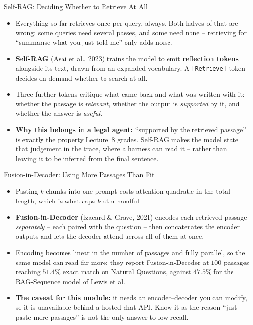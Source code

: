\begin{frame}{Self-RAG: Deciding Whether to Retrieve At All}
\begin{itemize}
  \item Everything so far retrieves once per query, always. Both halves of that are wrong: some queries need several passes, and some need none -- retrieving for ``summarise what you just told me'' only adds noise.
  \pause
  \item \textbf{Self-RAG} (Asai et al., 2023) trains the model to emit \textbf{reflection tokens} alongside its text, drawn from an expanded vocabulary. A \texttt{[Retrieve]} token decides on demand whether to search at all.
  \pause
  \item Three further tokens critique what came back and what was written with it: whether the passage is \emph{relevant}, whether the output is \emph{supported} by it, and whether the answer is \emph{useful}.
  \pause
  \item \textbf{Why this belongs in a legal agent:} ``supported by the retrieved passage'' is exactly the property Lecture~8 grades. Self-RAG makes the model state that judgement in the trace, where a harness can read it -- rather than leaving it to be inferred from the final sentence.
\end{itemize}
\end{frame}

\begin{frame}{Fusion-in-Decoder: Using More Passages Than Fit}
\begin{itemize}
  \item Pasting $k$ chunks into one prompt costs attention quadratic in the total length, which is what caps $k$ at a handful.
  \pause
  \item \textbf{Fusion-in-Decoder} (Izacard \& Grave, 2021) encodes each retrieved passage \emph{separately} -- each paired with the question -- then concatenates the encoder outputs and lets the decoder attend across all of them at once.
  \pause
  \item Encoding becomes linear in the number of passages and fully parallel, so the same model can read far more: they report Fusion-in-Decoder at $100$ passages reaching $51.4\%$ exact match on Natural Questions, against $47.5\%$ for the RAG-Sequence model of Lewis et al.
  \pause
  \item \textbf{The caveat for this module:} it needs an encoder--decoder you can modify, so it is unavailable behind a hosted chat API. Know it as the reason ``just paste more passages'' is not the only answer to low recall.
\end{itemize}
\end{frame}


